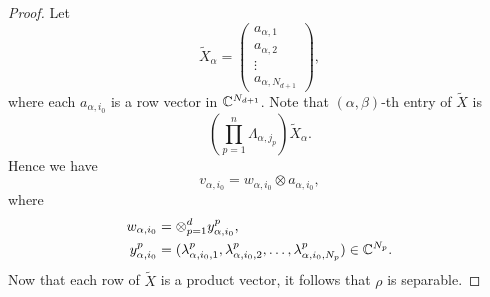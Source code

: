 \begin{proof}
   
Let 
    \begin{equation*}
      \tilde X_{\alpha}  =
      \begin{pmatrix}
        a_{\alpha,1}\\
        a_{\alpha,2}\\
        \vdots\\
        a_{\alpha,N_{d+1}}
      \end{pmatrix},
    \end{equation*}
    where each $a_{\alpha,i_0}$ is a row vector in $\mathbb{C}^{N_{d+1}}$. Note that
    $(\alpha,\beta)$-th entry of $\tilde X$  is
    \begin{equation*}
     \left( \prod_{p=1}^n \Lambda_{\alpha,j_p} \right)\tilde X_{\alpha}.
   \end{equation*}
   Hence we have
    \begin{equation}
      \label{eq:38}
      v_{\alpha,i_0} = w_{\alpha,i_0} \otimes a_{\alpha,i_0},
    \end{equation}
    where
    \begin{equation*}
      \begin{split}
        w_{\alpha,i_0} &= \otimes _{p=1}^d y_{\alpha,i_0}^p,\\
        y_{\alpha,i_0}^p & = (\lambda_{\alpha,i_0,1}^p,\lambda^p_{\alpha,i_0,2},\ldots,\lambda^p_{\alpha,i_0,N_p})\in
        \mathbb{C}^{N_p}.
      \end{split}
    \end{equation*}
    Now that each row of $\tilde X$ is a product vector, it follows that  $\rho$ is  separable.
  \end{proof}

